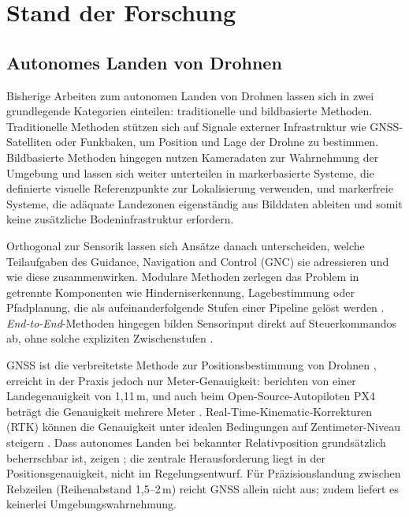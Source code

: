 \chapter{Stand der Forschung}
\label{cha:Stand der Forschung}

\section{Autonomes Landen von Drohnen}
\label{sec:landen}

Bisherige Arbeiten zum autonomen Landen von Drohnen lassen sich in zwei grundlegende Kategorien einteilen: traditionelle und bildbasierte Methoden.
Traditionelle Methoden stützen sich auf Signale externer Infrastruktur wie GNSS-Satelliten oder Funkbaken, um Position und Lage der Drohne zu bestimmen.
Bildbasierte Methoden hingegen nutzen Kameradaten zur Wahrnehmung der Umgebung und lassen sich weiter unterteilen in markerbasierte Systeme, die definierte
visuelle Referenzpunkte zur Lokalisierung verwenden, und markerfreie Systeme, die adäquate Landezonen eigenständig aus Bilddaten ableiten und somit keine
zusätzliche Bodeninfrastruktur erfordern.

Orthogonal zur Sensorik lassen sich Ansätze danach unterscheiden, welche Teilaufgaben des Guidance, Navigation and Control (GNC) \autocite{kanellakisSurveyComputerVision2017} sie adressieren und wie diese zusammenwirken. Modulare Methoden zerlegen das Problem in getrennte Komponenten wie Hinderniserkennung, Lagebestimmung oder Pfadplanung, die als aufeinanderfolgende Stufen einer Pipeline gelöst werden \autocite{kanellakisSurveyComputerVision2017, wangVisionBasedDeepReinforcement2024}. \textit{End-to-End}-Methoden hingegen bilden Sensorinput direkt auf Steuerkommandos ab, ohne solche expliziten Zwischenstufen \autocite{wangVisionBasedDeepReinforcement2024}.

GNSS ist die verbreitetste Methode zur Positionsbestimmung von Drohnen \autocite{jarrayaGnssdeniedUnmannedAerial2025}, erreicht in der Praxis jedoch nur Meter-Genauigkeit: \textcite{patrikGNSSbasedNavigationSystems2019} berichten von einer Landegenauigkeit von 1,11\,m, und auch beim Open-Source-Autopiloten PX4 beträgt die Genauigkeit mehrere Meter \autocite{meierPX4NodebasedMultithreaded2015, wubbenAccurateLandingUnmanned2019}. Real-Time-Kinematic-Korrekturen (RTK) können die Genauigkeit unter idealen Bedingungen auf Zentimeter-Niveau steigern \autocite{tavasciReliabilityRealTimeKinematic2024}. Dass autonomes Landen bei bekannter Relativposition grundsätzlich beherrschbar ist, zeigen \textcite{voosNonlinearTrackingLanding2010}; die zentrale Herausforderung liegt in der Positionsgenauigkeit, nicht im Regelungsentwurf. Für Präzisionslandung zwischen Rebzeilen (Reihenabstand 1,5–2\,m) reicht GNSS allein nicht aus; zudem liefert es keinerlei Umgebungswahrnehmung.

